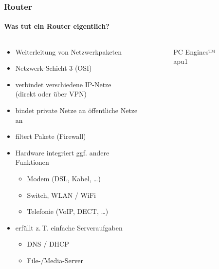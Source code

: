 \documentclass[t]{beamer}
\begin{document}
\begin{frame}
    \frametitle{Router}
    \framesubtitle{Was tut ein Router eigentlich?}
    \begin{columns}[T]
        \begin{column}{0.65\textwidth}
            \begin{itemize}
                \item Weiterleitung von Netzwerkpaketen
                \item Netzwerk-Schicht 3 (OSI)
                \item verbindet verschiedene IP-Netze\\(direkt oder über VPN)
                \item bindet private Netze an öffentliche Netze an
                \item filtert Pakete (Firewall)
                \item Hardware integriert ggf. andere Funktionen
                    \begin{itemize}
                        \item Modem (DSL, Kabel, …)
                        \item Switch, WLAN / WiFi
                        \item Telefonie (VoIP, DECT, …)
                    \end{itemize}
                \item erfüllt z.\,T. einfache Serveraufgaben
                    \begin{itemize}
                        \item DNS / DHCP
                        \item File-/Media-Server
                    \end{itemize}
            \end{itemize}
        \end{column}
        \begin{column}{0.35\textwidth}
            \begin{figure}
                \caption{PC Engines™ apu1}
            \end{figure}
        \end{column}
    \end{columns}
\end{frame}
\end{document}
